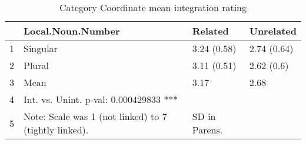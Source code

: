 \documentclass[a4paper,11pt]{article}\usepackage[]{graphicx}\usepackage[]{color}
\begin{document}
\begin{table}[ht]
\centering
\begin{tabular}{rlll}
  \hline
 & Local.Noun.Number & Related & Unrelated \\ 
  \hline
1 & Singular & 3.24 (0.58) & 2.74 (0.64) \\ 
  2 & Plural & 3.11 (0.51) & 2.62 (0.6) \\ 
  3 & Mean & 3.17 & 2.68 \\ 
  4 & Int. vs. Unint. p-val: 0.000429833 *** &   &   \\ 
  5 & Note: Scale was 1 (not linked) to 7 (tightly linked). & SD in Parens. &   \\ 
   \hline
\end{tabular}
\caption[CAT COORD Integration]{Category Coordinate mean integration rating} 
\end{table}
\end{document}
